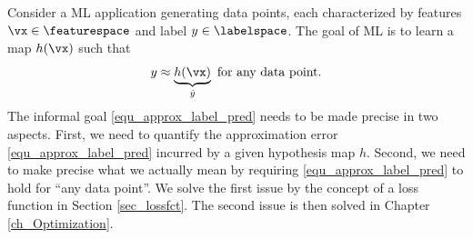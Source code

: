 \documentclass[12pt]{report}
\begin{document}
%

Consider a ML application generating data points, each characterized 
by features $\vx \in \featurespace$ and label $y \in \labelspace$. The goal 
of ML is to learn a map $h(\vx)$ such that 
\begin{equation} 
\label{equ_approx_label_pred}
y \approx \underbrace{h(\vx)}_{\hat{y}} \mbox{ for any data point}. 
\end{equation}  
The informal goal \eqref{equ_approx_label_pred} needs to be made precise 
in two aspects. First, we need to quantify the approximation error \eqref{equ_approx_label_pred} 
incurred by a given hypothesis map $h$. Second, we need to make precise 
what we actually mean by requiring \eqref{equ_approx_label_pred} to hold 
for ``any data point''. We solve the first issue by the concept of a loss 
function in Section \ref{sec_lossfct}. The second issue is then solved 
in Chapter \ref{ch_Optimization}. 


\end{document}
